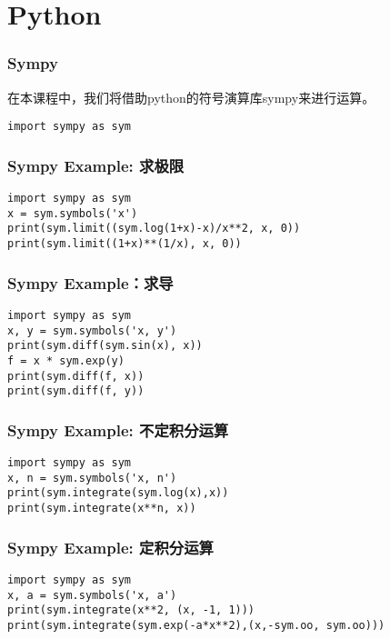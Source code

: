 \documentclass[CJK,13pt]{beamer}
\date{}
\begin{document}
  \bch
{}


\section{Python}


\begin{frame}[fragile]
  \frametitle{Sympy}
  在本课程中，我们将借助python的符号演算库sympy来进行运算。

\begin{verbatim}
import sympy as sym
\end{verbatim}
\ecode

\skipline

\end{frame}


\begin{frame}[fragile]
  \frametitle{Sympy Example: 求极限}
\begin{verbatim}
import sympy as sym
x = sym.symbols('x')
print(sym.limit((sym.log(1+x)-x)/x**2, x, 0))
print(sym.limit((1+x)**(1/x), x, 0))
\end{verbatim}
\ecode
\end{frame}

\begin{frame}[fragile]
  \frametitle{Sympy Example：求导}
\begin{verbatim}
import sympy as sym
x, y = sym.symbols('x, y')
print(sym.diff(sym.sin(x), x))
f = x * sym.exp(y)
print(sym.diff(f, x))
print(sym.diff(f, y))
\end{verbatim}
\ecode
\end{frame}


\begin{frame}[fragile]
  \frametitle{Sympy Example: 不定积分运算}
\begin{verbatim}
import sympy as sym
x, n = sym.symbols('x, n')
print(sym.integrate(sym.log(x),x))
print(sym.integrate(x**n, x))
\end{verbatim}
\ecode
\end{frame}

\begin{frame}[fragile]
  \frametitle{Sympy Example: 定积分运算}
\begin{verbatim}
import sympy as sym
x, a = sym.symbols('x, a')
print(sym.integrate(x**2, (x, -1, 1)))
print(sym.integrate(sym.exp(-a*x**2),(x,-sym.oo, sym.oo)))
\end{verbatim}
\ecode
\end{frame}
\end{document}
